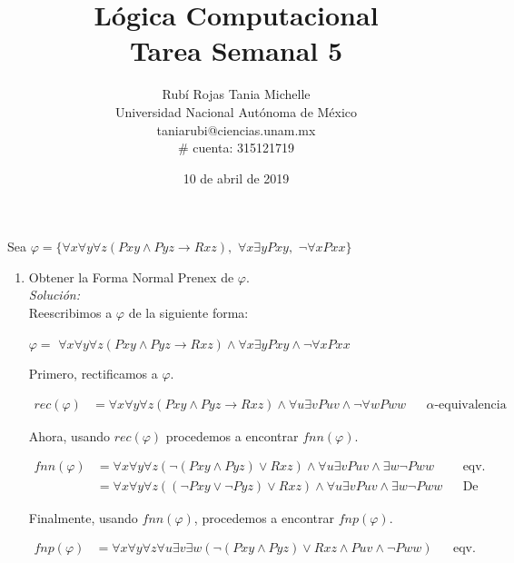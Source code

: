 \documentclass[letterpaper,12pt]{article}
\title{Lógica Computacional \\ Tarea Semanal 5}
\author{Rubí Rojas Tania Michelle \\
        Universidad Nacional Autónoma de México \\
        taniarubi@ciencias.unam.mx \\
        \# cuenta: 315121719}
\date{10 de abril de 2019}
\begin{document}
\maketitle

Sea $\varphi = \{ \forall x \forall y \forall z(Pxy \land Pyz
\rightarrow Rxz), $ $\forall x \exists y Pxy, $ $\neg \forall x Pxx\}$
\begin{enumerate}
    \item Obtener la Forma Normal Prenex de $\varphi$. \\
    \textit{Solución:} \\
    Reescribimos a $\varphi$ de la siguiente forma:
    
    \begin{center}
        $\varphi = $
        $\forall x \forall y \forall z(Pxy \land Pyz \rightarrow Rxz) \land 
        \forall x \exists y Pxy \land \neg \forall x Pxx$
    \end{center}

    Primero, rectificamos a $\varphi$. 
    
    \begin{align*}
        rec(\varphi) &= 
        \forall x \forall y \forall z(Pxy \land Pyz \rightarrow Rxz) \land 
        \forall u \exists v Puv \land \neg \forall w Pww
        && \text{$\alpha$-equivalencia}
    \end{align*}
    
    Ahora, usando $rec(\varphi)$ procedemos a encontrar $fnn(\varphi)$.
    
    \begin{align*}
        fnn(\varphi) 
        &= \forall x \forall y \forall z(\neg (Pxy \land Pyz) \lor Rxz) \land
        \forall u \exists v Puv \land \exists w \neg Pww
        && \text{eqv. lógicas} \\
        &= \forall x \forall y \forall z((\neg Pxy \lor \neg Pyz) \lor Rxz)
        \land \forall u \exists v Puv \land \exists w \neg Pww
        && \text{De Morgan}
    \end{align*}

    Finalmente, usando $fnn(\varphi)$,  procedemos a encontrar $fnp(\varphi)$.
    
    \begin{align*}
        fnp(\varphi)
        &= \forall x \forall y \forall z \forall u \exists v \exists w
        (\neg (Pxy \land Pyz) \lor Rxz \land Puv \land \neg Pww)
        && \text{eqv. lógicas}
    \end{align*}


\end{enumerate}
\end{document}
